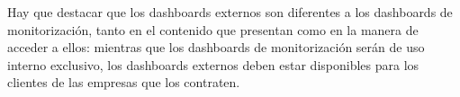 Hay que destacar que los dashboards externos son diferentes a los dashboards de monitorización, tanto
en el contenido que presentan como en la manera de acceder a ellos: mientras que los dashboards de
monitorización serán de uso interno exclusivo, los dashboards externos deben estar disponibles para
los clientes de las empresas que los contraten.






